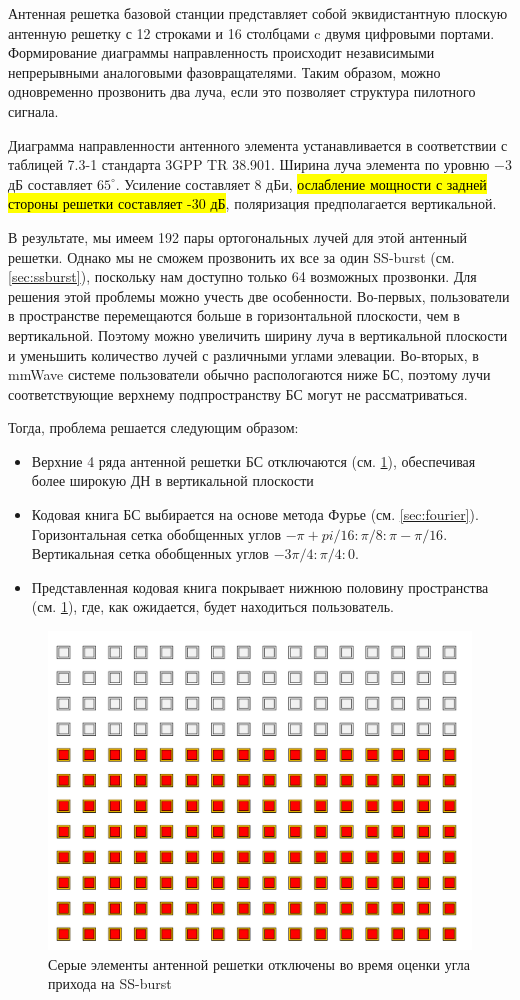 Антенная решетка базовой станции представляет собой эквидистантную плоскую
антенную решетку с 12 строками и 16 столбцами c двумя цифровыми портами.
Формирование диаграммы направленность происходит независимыми непрерывными
аналоговыми фазовращателями. Таким образом, можно одновременно прозвонить два
луча, если это позволяет структура пилотного сигнала.

Диаграмма направленности антенного элемента устанавливается в соответствии с
таблицей 7.3-1 стандарта 3GPP TR 38.901. Ширина луча элемента по уровню $-3$ дБ
составляет $65^\circ$. Усиление составляет 8 дБи, \hl{ослабление мощности с задней
стороны решетки составляет -30 дБ}, поляризация предполагается вертикальной.

В результате, мы имеем 192 пары ортогональных лучей для этой антенный решетки.
Однако мы не сможем прозвонить их все за один SS-burst (см. \ref{sec:ssburst}),
поскольку нам доступно только 64 возможных прозвонки. Для решения этой проблемы
можно учесть две особенности.  Во-первых, пользователи в пространстве перемещаются больше в
горизонтальной плоскости, чем в вертикальной. Поэтому можно увеличить ширину
луча в вертикальной плоскости и уменьшить количество лучей с различными углами
элевации.  Во-вторых, в mmWave системе пользователи обычно распологаются ниже
БС, поэтому лучи соответствующие верхнему подпространству БС могут не
рассматриваться.

Тогда, проблема решается следующим образом:
\begin{itemize}
    \item Верхние 4 ряда антенной решетки БС отключаются (см. \ref{fig:4.6}), обеспечивая более широкую ДН в вертикальной плоскости
    \item Кодовая книга БС выбирается на основе метода Фурье (см.
    \ref{sec:fourier}). Горизонтальная сетка обобщенных углов $-\pi +
    pi/16:\pi/8:\pi-\pi/16$.
          Вертикальная сетка обобщенных углов $-3\pi/4:\pi/4:0$.
    \item Представленная кодовая книга покрывает нижнюю половину пространства (см. \ref{fig:4.6}), где, как ожидается, будет находиться пользователь.
\end{itemize}

\begin{figure}[ht]
    \centering
    \includegraphics[width=0.35\linewidth]{figs/fig4.5.png}
    \caption{Серые элементы антенной решетки отключены во время оценки угла прихода на SS-burst}
    \label{fig:4.6}
\end{figure}

